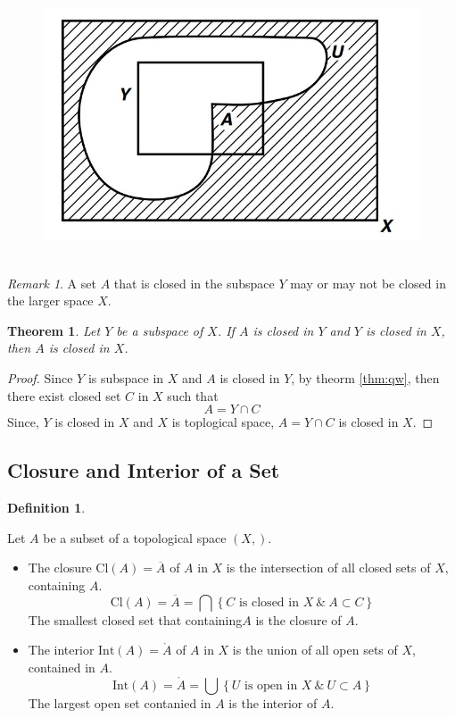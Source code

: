 \documentclass[
]{book}
\providecommand{\tightlist}{%
  \setlength{\itemsep}{0pt}\setlength{\parskip}{0pt}}
\newtheorem{theorem}{Theorem}[chapter]
\theoremstyle{definition}
\newtheorem{definition}{Definition}[chapter]
\theoremstyle{definition}
\theoremstyle{definition}
\theoremstyle{definition}
\theoremstyle{remark}
\newtheorem*{remark}{Remark}
\begin{document}
\begin{figure}
\includegraphics[width=0.5\linewidth]{figures/figure 20} \caption{$~$}\label{fig:fig20}
\end{figure}

\begin{remark}
A set \(A\) that is closed in the subspace \(Y\) may or may not be closed in the larger space \(X\).
\end{remark}

\begin{theorem}
\protect\hypertarget{thm:unnamed-chunk-63}{}\label{thm:unnamed-chunk-63}Let \(Y\) be a subspace of \(X\). If \(A\) is closed in \(Y\) and \(Y\) is closed in \(X\), then \(A\) is closed in \(X\).
\end{theorem}

\begin{proof}
Since \(Y\) is subspace in \(X\) and \(A\) is closed in \(Y\), by theorm \ref{thm:qw}, then there exist closed set \(C\) in \(X\) such that \[A=Y\cap C\]
Since, \(Y\) is closed in \(X\) and \(X\) is toplogical space, \(A=Y\cap C\) is closed in \(X\).
\end{proof}

\hypertarget{closure-and-interior-of-a-set}{%
\subsection{Closure and Interior of a Set}\label{closure-and-interior-of-a-set}}

\begin{definition}
\protect\hypertarget{def:unnamed-chunk-65}{}\label{def:unnamed-chunk-65}

Let \(A\) be a subset of a topological space \((X, \mathcal{})\).

\begin{itemize}
\tightlist
\item
  The closure Cl\((A)=\overline{A}\) of \(A\) in \(X\) is the intersection of all closed sets of \(X\), containing \(A\).
  \[\text{Cl}(A)=\overline{A}=\bigcap \left\{C \text{ is closed in } X~ \&~  A \subset C\right\}\]
  The smallest closed set that containing\(A\) is the closure of \(A\).
\item
  The interior \(\text{Int}(A)=\mathring{A}\) of \(A\) in \(X\) is the union of all open sets of \(X\), contained in \(A\).
  \[\text{Int}(A)=\mathring{A}=\bigcup \left\{U \text{ is open in } X~ \&~  U \subset A\right\}\]
  The largest open set contanied in \(A\) is the interior of \(A\).
\end{itemize}

\end{definition}
\end{document}
